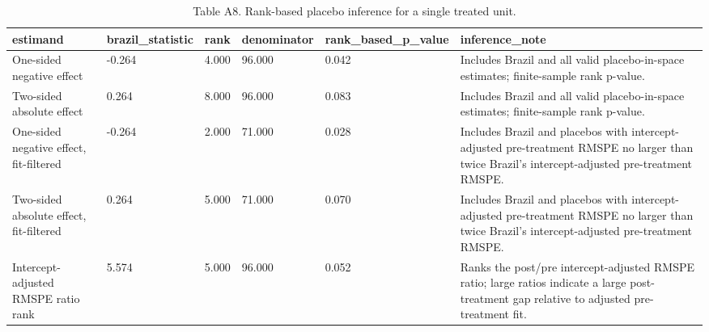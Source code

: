 \begin{table}

\caption{\label{tab:tab:sdid-placebo-rank}Table A8. Rank-based placebo inference for a single treated unit.}
\centering
\begin{tabular}[t]{llllll}
\toprule
estimand & brazil\_statistic & rank & denominator & rank\_based\_p\_value & inference\_note\\
\midrule
One-sided negative effect & -0.264 & 4.000 & 96.000 & 0.042 & Includes Brazil and all valid placebo-in-space estimates; finite-sample rank p-value.\\
Two-sided absolute effect & 0.264 & 8.000 & 96.000 & 0.083 & Includes Brazil and all valid placebo-in-space estimates; finite-sample rank p-value.\\
One-sided negative effect, fit-filtered & -0.264 & 2.000 & 71.000 & 0.028 & Includes Brazil and placebos with intercept-adjusted pre-treatment RMSPE no larger than twice Brazil's intercept-adjusted pre-treatment RMSPE.\\
Two-sided absolute effect, fit-filtered & 0.264 & 5.000 & 71.000 & 0.070 & Includes Brazil and placebos with intercept-adjusted pre-treatment RMSPE no larger than twice Brazil's intercept-adjusted pre-treatment RMSPE.\\
Intercept-adjusted RMSPE ratio rank & 5.574 & 5.000 & 96.000 & 0.052 & Ranks the post/pre intercept-adjusted RMSPE ratio; large ratios indicate a large post-treatment gap relative to adjusted pre-treatment fit.\\
\bottomrule
\end{tabular}
\end{table}
